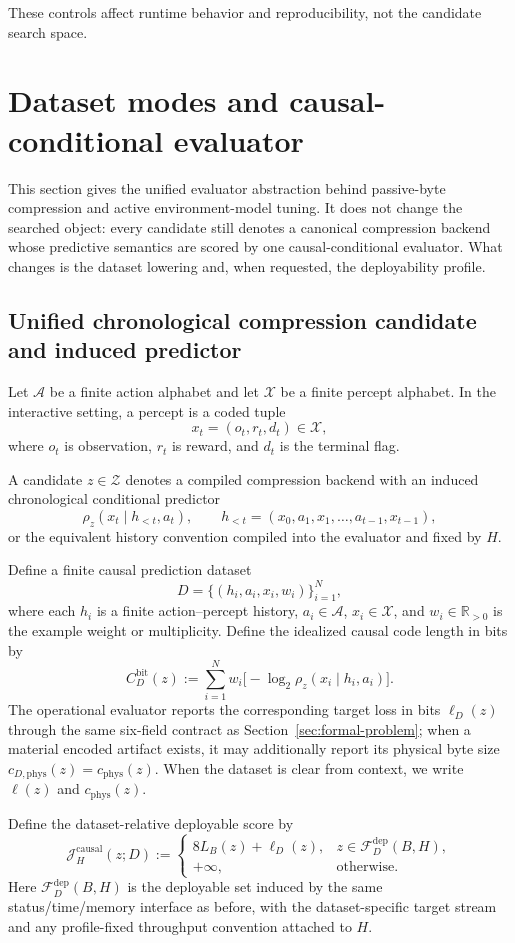 \documentclass[11pt]{article}
\begin{document}
These controls affect runtime behavior and reproducibility, not the candidate search space.

\section{Dataset modes and causal-conditional evaluator}
\label{sec:causal-evaluator}

This section gives the unified evaluator abstraction behind passive-byte
compression and active environment-model tuning. It does not change the
searched object: every candidate still denotes a canonical compression backend
whose predictive semantics are scored by one causal-conditional evaluator.
What changes is the dataset lowering and, when requested, the deployability
profile.

\subsection{Unified chronological compression candidate and induced predictor}

Let $\mathcal{A}$ be a finite action alphabet and let $\mathcal{X}$ be a
finite percept alphabet. In the interactive setting, a percept is a coded tuple
\[
x_t=(o_t,r_t,d_t)\in\mathcal{X},
\]
where $o_t$ is observation, $r_t$ is reward, and $d_t$ is the terminal flag.

A candidate $z\in\mathcal{Z}$ denotes a compiled compression backend with an
induced chronological conditional predictor
\[
\rho_z(x_t\mid h_{<t},a_t),
\qquad
h_{<t}=(x_0,a_1,x_1,\dots,a_{t-1},x_{t-1}),
\]
or the equivalent history convention compiled into the evaluator and fixed by
$H$.

Define a finite causal prediction dataset
\[
D=\{(h_i,a_i,x_i,w_i)\}_{i=1}^N,
\]
where each $h_i$ is a finite action--percept history, $a_i\in\mathcal{A}$,
$x_i\in\mathcal{X}$, and $w_i\in\mathbb{R}_{>0}$ is the example weight or
multiplicity. Define the idealized causal code length in bits by
\[
C_D^{\mathrm{bit}}(z)
:=
\sum_{i=1}^{N}
w_i\bigl[-\log_2 \rho_z(x_i\mid h_i,a_i)\bigr].
\]
The operational evaluator reports the corresponding target loss in bits
$\ell_D(z)$ through the same six-field contract as
Section~\ref{sec:formal-problem}; when a material encoded artifact exists, it
may additionally report its physical byte size
$c_{D,\mathrm{phys}}(z)=c_{\mathrm{phys}}(z)$. When the dataset is clear from
context, we write $\ell(z)$ and $c_{\mathrm{phys}}(z)$.

Define the dataset-relative deployable score by
\[
\mathcal{J}_H^{\mathrm{causal}}(z;D)
:=
\begin{cases}
8L_B(z)+\ell_D(z), & z\in\mathcal{F}_{D}^{\mathrm{dep}}(B,H),\\[3pt]
+\infty, & \text{otherwise.}
\end{cases}
\]
Here $\mathcal{F}_{D}^{\mathrm{dep}}(B,H)$ is the deployable set induced by the
same status/time/memory interface as before, with the dataset-specific target
stream and any profile-fixed throughput convention attached to $H$.
\end{document}
